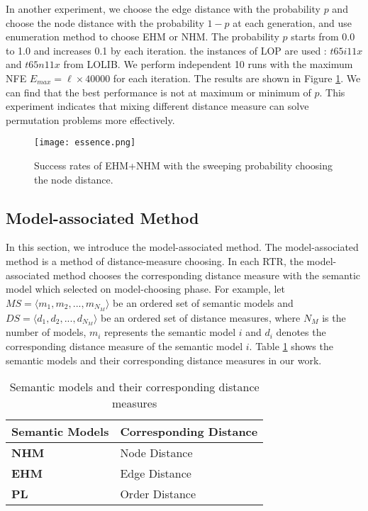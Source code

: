 In another experiment, we choose the edge distance with the probability $p$ and choose the node distance with the probability $1-p$ at each generation, and use enumeration method to choose EHM or NHM. The probability $p$ starts from 0.0 to 1.0 and increases 0.1 by each iteration. the instances of LOP are used : $t65i11x$ and $t65n11x$ from LOLIB. We perform independent 10 runs with the maximum NFE $E_{max} = \ell \times 40000$ for each iteration. The results are shown in Figure \ref{fig:sweep_imp}. We can find that the best performance is not at maximum or minimum of $p$. This experiment indicates that mixing different distance measure can solve permutation problems more effectively.



\begin{figure}[htbp] 
        \centering
        \texttt{[image: essence.png]}
        \caption{ Success rates of EHM+NHM with the sweeping probability choosing the node distance. } 
        \label{fig:sweep_imp}
\end{figure}


\subsection{Model-associated Method}
In this section, we introduce the model-associated method. The model-associated method is a method of distance-measure choosing. In each RTR, the model-associated method chooses the corresponding distance measure with the semantic model which selected on model-choosing phase. For example, let $MS=\langle m_1 , m_2, ..., m_{N_M}\rangle$ be an ordered set of semantic models and $DS=\langle d_1 , d_2, ..., d_{N_M}\rangle$ be an ordered set of distance measures, where ${N_M}$ is the number of models, $m_i$ represents the semantic model $i$ and $d_i$ denotes the corresponding distance measure of the semantic model $i$. Table \ref{tb:model_distance} shows the semantic models and their corresponding distance measures in our work.


\begin{table}[htbp]
    \centering
    \begin{tabular}{|l|l|}
    \hline
    \textbf{Semantic Models}       & \textbf{Corresponding Distance}  \\ \hline
    \textbf{NHM} & Node Distance    	 \\ \hline
    \textbf{EHM} & Edge Distance  	\\ \hline
    \textbf{PL} & Order Distance  	\\ \hline
  
    \end{tabular} 
    \caption{Semantic models and their corresponding distance measures}
    \label{tb:model_distance}
\end{table}

